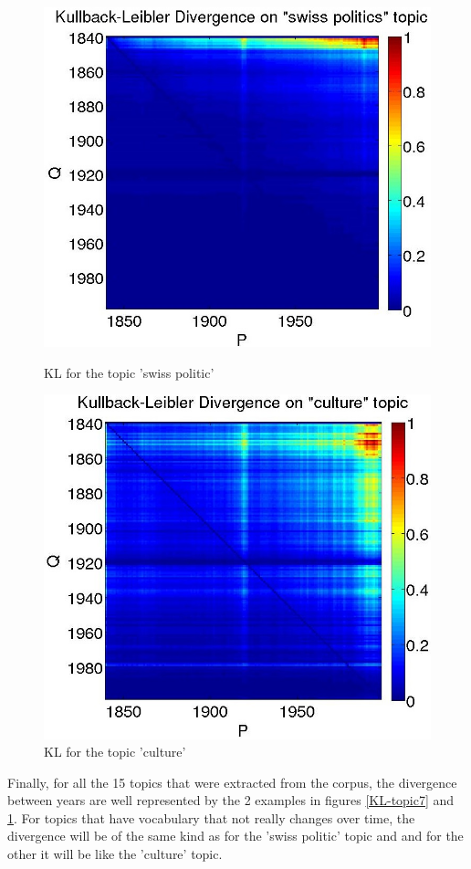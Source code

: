 \begin{figure}[H]
    \begin{minipage}[b]{0.48\linewidth}
        \includegraphics[scale=0.25]{Pictures/topics/kullback-leibler/KL_topic7.jpg}
        \caption{KL for the topic 'swiss politic'}
        \label{KL-topic7}
    \end{minipage}\hfill
    \begin{minipage}[b]{0.5\linewidth}
        \includegraphics[scale=0.25]{Pictures/topics/kullback-leibler/KL_topic1.jpg}
        \caption{KL for the topic 'culture'}
        \label{KL-topic1}
    \end{minipage}\hfill
\end{figure}

Finally, for all the 15 topics that were extracted from the corpus, the divergence between years are well represented by the 2 examples in figures \ref{KL-topic7} and \ref{KL-topic1}. For topics that have vocabulary that not really changes over time, the divergence will be of the same kind as for the 'swiss politic' topic and and for the other it will be like the 'culture' topic.
